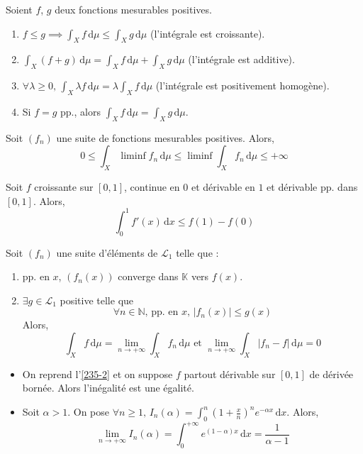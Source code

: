 	\begin{application}
		Soient $f$, $g$ deux fonctions mesurables positives.
		\begin{enumerate}[label=(\roman*)]
			\item $f \leq g \implies \int_X f \, \mathrm{d}\mu \leq \int_X g \, \mathrm{d}\mu$ (l'intégrale est croissante).
			\item $\int_X (f+g) \, \mathrm{d}\mu = \int_X f \, \mathrm{d}\mu + \int_X g \, \mathrm{d}\mu$ (l'intégrale est additive).
			\item $\forall \lambda \geq 0, \, \int_X \lambda f \, \mathrm{d}\mu = \lambda \int_X f \, \mathrm{d}\mu$ (l'intégrale est positivement homogène).
			\item Si $f = g$ pp., alors $\int_X f \, \mathrm{d}\mu = \int_X g \, \mathrm{d}\mu$.
		\end{enumerate}
	\end{application}


	\begin{theorem}
		Soit $(f_n)$ une suite de fonctions mesurables positives. Alors,
		\[ 0 \leq \int_X \liminf f_n \, \mathrm{d}\mu \leq \liminf \int_X f_n \, \mathrm{d}\mu \leq +\infty \]
	\end{theorem}

	\begin{example}
		\label{235-2}
		Soit $f$ croissante sur $[0,1]$, continue en $0$ et dérivable en $1$ et dérivable pp. dans $[0,1]$. Alors,
		\[ \int_{0}^{1} f'(x) \, \mathrm{d}x \leq f(1) - f(0) \]
	\end{example}

	\begin{theorem}
		Soit $(f_n)$ une suite d'éléments de $\mathcal{L}_1$ telle que :
		\begin{enumerate}[label=(\roman*)]
			\item pp. en $x$, $(f_n(x))$ converge dans $\mathbb{K}$ vers $f(x)$.
			\item $\exists g \in \mathcal{L}_1$ positive telle que
			\[ \forall n \in \mathbb{N}, \, \text{pp. en } x, \, \vert f_n(x) \vert \leq g(x) \]
			Alors,
			\[ \int_X f \, \mathrm{d}\mu = \lim_{n \rightarrow +\infty} \int_X f_n \, \mathrm{d}\mu \text{ et } \lim_{n \rightarrow +\infty} \int_X \vert f_n - f \vert \, \mathrm{d}\mu = 0 \]
		\end{enumerate}
	\end{theorem}

	\begin{example}
		\begin{itemize}
			\item On reprend l'\cref{235-2} et on suppose $f$ partout dérivable sur $[0,1]$ de dérivée bornée. Alors l'inégalité est une égalité.
			\item Soit $\alpha > 1$. On pose $\forall n \geq 1, \, I_n(\alpha) = \int_0^n \left( 1 + \frac{x}{n} \right)^n e^{-\alpha x} \, \mathrm{d}x$. Alors,
			\[ \lim_{n \rightarrow +\infty} I_n(\alpha) = \int_0^{+\infty} e^{(1-\alpha)x} \, \mathrm{d}x = \frac{1}{\alpha - 1} \]
		\end{itemize}
	\end{example}

